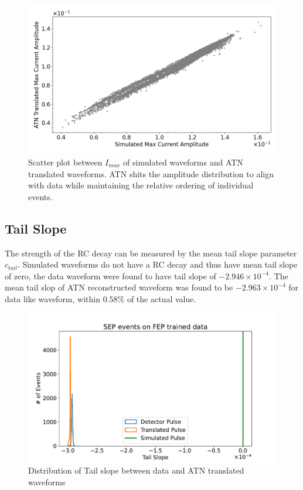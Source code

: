 \begin{figure}[htb!]
\centering
\includegraphics[width=0.99\linewidth,trim={0pc 0pc 0pc 0pc},clip]{ch8/figs/SEP_scatter_current_amplitude.png}
\caption{Scatter plot between $I_{max}$ of simulated waveforms and ATN translated waveforms. ATN shits the amplitude distribution to align with data while maintaining the relative ordering of individual events.}
\label{fig:current_amp}
\end{figure}



\subsection{Tail Slope}
The strength of the RC decay can be measured by the mean tail slope parameter $c_{tail}$. Simulated waveforms do not have a RC decay and thus have mean tail slope of zero, the data waveform were found to have tail slope of $-2.946\times10^{-4}$. The mean tail slop of ATN reconstructed waveform was found to be $-2.963\times10^{-4}$ for data like waveform, within $0.58\%$ of the actual value.

\begin{figure}[htb!]
\centering
\includegraphics[width=0.97\linewidth,trim={2pc 0pc 2pc 0pc},clip]{ch8/figs/SEP_sim_ts.pdf}
\caption{ Distribution of Tail slope between data and ATN translated waveforms}
\label{ch8:fig:tail_slope_comp}
\end{figure}


